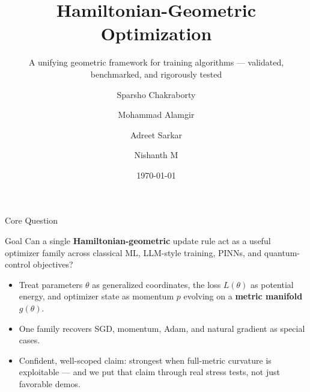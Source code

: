 \documentclass[aspectratio=169,11pt]{beamer}
\title{Hamiltonian-Geometric Optimization}
\subtitle{A unifying geometric framework for training algorithms --- validated, benchmarked, and rigorously tested}
\author{Sparsho Chakraborty \and Mohammad Alamgir \and Adreet Sarkar \and Nishanth M}
\institute{Hamiltonian Metric-Based Optimizer}
\date{\today}
\begin{document}
\begin{frame}
  \maketitle
\end{frame}

\begin{frame}{Core Question}
  \begin{block}{Goal}
    Can a single \textbf{Hamiltonian-geometric} update rule act as a useful optimizer family
    across classical ML, LLM-style training, PINNs, and quantum-control objectives?
  \end{block}
  \begin{itemize}
    \item Treat parameters $\theta$ as generalized coordinates, the loss $L(\theta)$ as potential
      energy, and optimizer state as momentum $p$ evolving on a \textbf{metric manifold} $g(\theta)$.
    \item One family recovers SGD, momentum, Adam, and natural gradient as special cases.
    \item Confident, well-scoped claim: strongest when full-metric curvature is exploitable ---
      and we put that claim through real stress tests, not just favorable demos.
  \end{itemize}
\end{frame}
\end{document}
